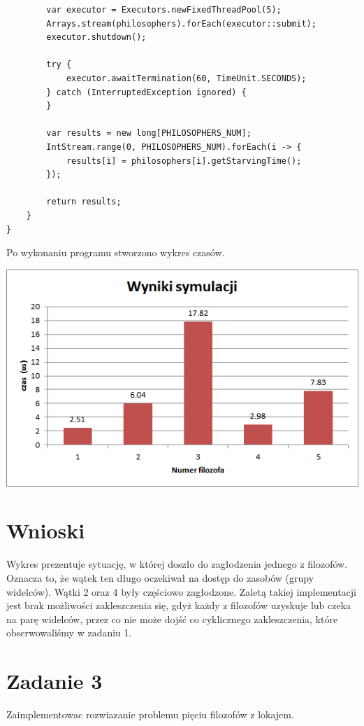 \documentclass[12pt]{article}
\begin{document}
\begin{verbatim}
        var executor = Executors.newFixedThreadPool(5);
        Arrays.stream(philosophers).forEach(executor::submit);
        executor.shutdown();

        try {
            executor.awaitTermination(60, TimeUnit.SECONDS);
        } catch (InterruptedException ignored) {
        }

        var results = new long[PHILOSOPHERS_NUM];
        IntStream.range(0, PHILOSOPHERS_NUM).forEach(i -> {
            results[i] = philosophers[i].getStarvingTime();
        });

        return results;
    }
}
\end{verbatim}


\noindent
Po wykonaniu programu stworzono wykres czasów.
\begin{center}
\centering
    \includegraphics{philosophers_both_forks.png}
\end{center}

\newpage
\section{Wnioski}
Wykres prezentuje sytuację, w której doszło do zagłodzenia jednego z filozofów. Oznacza to, że wątek ten długo oczekiwał na dostęp do zasobów (grupy widelców). Wątki 2 oraz 4 były częściowo zagłodzone. Zaletą takiej implementacji jest brak możliwości zakleszczenia się, gdyż każdy z filozofów uzyskuje lub czeka na parę widelców, przez co nie może dojść co cyklicznego zakleszczenia, które obserwowaliśmy w zadaniu 1.



\section{Zadanie 3}
Zaimplementowac rozwiazanie problemu pięciu filozofów z lokajem.
\end{document}
